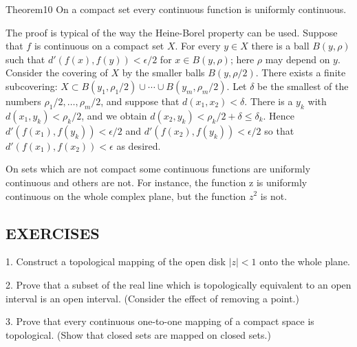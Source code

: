 \begin{originalstatement}{Theorem}{10}\label{thm:3.10}
On a compact set every continuous function is uniformly continuous.
\end{originalstatement}
The proof is typical of the way the Heine-Borel property can be used. Suppose that $f$ is continuous on a compact set $X$. For every $y \in X$ there is a ball $B(y, \rho)$ such that $d'(f(x), f(y)) < \epsilon/2$ for $x \in B(y, \rho)$; here $\rho$ may depend on $y$. Consider the covering of $X$ by the smaller balls $B(y, \rho/2)$. There exists a finite subcovering: $X \subset B(y_1, \rho_1/2) \cup \cdots \cup B(y_m, \rho_m/2)$. Let $\delta$ be the smallest of the numbers $\rho_1/2, \ldots, \rho_m/2$, and suppose that $d(x_1, x_2) < \delta$. There is a $y_k$ with $d(x_1, y_k) < \rho_k/2$, and we obtain $d(x_2, y_k) < \rho_k/2 + \delta \leq \delta_k$. Hence $d'(f(x_1), f(y_k)) < \epsilon/2$ and $d'(f(x_2), f(y_k)) < \epsilon/2$ so that $d'(f(x_1), f(x_2)) < \epsilon$ as desired.

On sets which are not compact some continuous functions are uniformly continuous and others are not. For instance, the function z is uniformly continuous on the whole complex plane, but the function $z^{2}$ is not.

\begingroup\renewcommand{\thefootnote}{}\endgroup

\subsection*{EXERCISES}
1. Construct a topological mapping of the open disk $|z| < 1$ onto the whole plane.

2. Prove that a subset of the real line which is topologically equivalent to an open interval is an open interval. (Consider the effect of removing a point.)

3. Prove that every continuous one-to-one mapping of a compact space is topological. (Show that closed sets are mapped on closed sets.)

